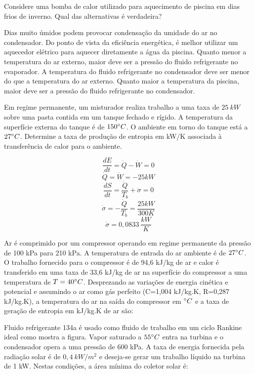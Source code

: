 \documentclass[answers]{exam}
\begin{document}
\begin{multicols}{2}
\begin{questions}
    \question Considere uma bomba de calor utilizado para aquecimento de piscina em dias frios de inverno. Qual das alternativas é verdadeira?
    \begin{checkboxes}
      \choice Dias muito úmidos podem provocar condensação da umidade do ar no condensador.
      \choice Do ponto de vista da eficiência energética, é melhor utilizar um aquecedor elétrico para aquecer diretamente a água da piscina.
      \choice Quanto menor a temperatura do ar externo, maior deve ser a pressão do fluido refrigerante no evaporador.
      \choice A temperatura do fluido refrigerante no condensador deve ser menor do que a temperatura do ar externo.
      \CorrectChoice Quanto maior a temperatura da piscina, maior deve ser a pressão do fluido refrigerante no condensador.
    \end{checkboxes}



    \question Em regime permanente, um misturador realiza trabalho a uma taxa de $25\ kW$ sobre uma pasta contida em um tanque fechado e rígido. A temperatura da superfície externa do tanque é de $150\degree C$. O ambiente em torno do tanque está a $27\degree C$. Determine a taxa de produção de entropia em kW/K associada à transferência de calor para o ambiente.
    \begin{multicols}{2}
      $$\frac{dE}{dt} = \dot Q - \dot W = 0$$
      $$\dot Q = \dot W = -25 kW$$
      $$\frac{dS}{dt} = \frac{\dot Q}{T_b} + \dot\sigma = 0$$
      $$\dot\sigma = -\frac{\dot Q}{T_b} = \frac{25 kW}{300 K}$$
      $$\dot\sigma = 0,0833\ \frac{kW}{K}$$
    \end{multicols}



    \question Ar é comprimido por um compressor operando em regime permanente da pressão de 100 kPa para 210 kPa. A temperatura de entrada do ar ambiente é de $27\degree C$. O trabalho fornecido para o compressor é de 94,6 kJ/kg de ar e calor é transferido em uma taxa de 33,6 kJ/kg de ar na superfície do compressor a uma temperatura de $T = 40\degree C$. Desprezando as variações de energia cinética e potencial e assumindo o ar como gás perfeito (C=1,004 kJ/kg.K, R=0,287 kJ/kg.K), a temperatura do ar na saída do compressor em $\degree C$ e a taxa de geração de entropia em kJ/kg.K de ar são:



    \question Fluido refrigerante 134a é usado como fluido de trabalho em um ciclo Rankine ideal como mostra a figura. Vapor saturado a $55\degree C$ entra na turbina e o condensador opera a uma pressão de 600 kPa. A taxa de energia fornecida pela radiação solar é de $0,4\ kW/m^2$ e deseja-se gerar um trabalho líquido na turbina de 1 kW. Nestas condições, a área mínima do coletor solar é:




\end{questions}
\end{multicols}
\end{document}
